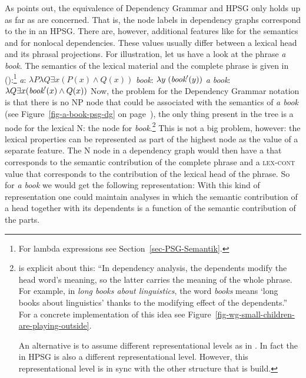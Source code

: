 As \citet{Oliva2003a} points out, the equivalence of Dependency Grammar and HPSG only holds up as far
as \headvs are concerned.
That is, the node labels in dependency graphs correspond to the \headvs in
an HPSG. There are, however, additional features like \cont for the semantics and \slasch for
nonlocal dependencies. These values usually differ between a lexical head and its phrasal
projections. For illustration, let us have a look at the phrase \emph{a book}. The semantics of the
lexical material and the complete phrase is given in ():\footnote{
  For lambda expressions see Section~\ref{sec-PSG-Semantik}.
}
\eal
\ex \emph{a}: $\lambda P \lambda Q \exists x (P(x) \wedge Q(x))$
\ex \emph{book}: $\lambda y\;(\textit{book}'(y))$
\ex \emph{a book}: $\lambda Q \exists x (\textit{book}'(x) \wedge Q(x))$
\zl
Now, the problem for the Dependency Grammar notation is that there is no NP node that could be
associated with the semantics of \emph{a book} (see Figure~\ref{fig-a-book-psg-dg} on page~\pageref{fig-a-book-psg-dg}), the only thing present in the tree is a node for the
lexical N: the node for \emph{book}.\footnote{
  \citet[--392]{Hudson2003a}\indexwg is explicit about this: ``In dependency analysis, the dependents modify the head
    word's meaning, so the latter carries the meaning of the whole phrase. For example, in
    \emph{long books about linguistics}, the word \emph{books} means `long books about linguistics'
    thanks to the modifying effect of the dependents.'' For a concrete implementation of this idea
    see Figure~\vref{fig-wg-small-children-are-playing-outside}.

   An alternative is to assume different representational levels as in \mtt \citep{Melcuk81a}. In fact the \contv in
   HPSG is also a different representational level. However, this representational level is in sync
   with the other structure that is build.
} This is not a big problem, however: the lexical
properties can be represented as part of the highest node as the value of a separate feature. The N
node in a dependency graph would then have a \contv that corresponds to the semantic contribution of
the complete phrase and a \textsc{lex-cont} value that corresponds to the contribution of the lexical
head of the phrase. So for \emph{a book} we would get the following representation:
\ea
{}
\z
With this kind of representation one could maintain analyses in which the semantic contribution of a
head together with its dependents is a function of the semantic contribution of the parts. 

